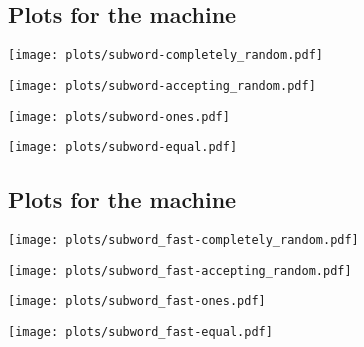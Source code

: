 \subsection{Plots for the  machine}
\label{plots_subword}
\begin{center}\texttt{[image: plots/subword-completely\_random.pdf]}\end{center}
\begin{center}\texttt{[image: plots/subword-accepting\_random.pdf]}\end{center}
\begin{center}\texttt{[image: plots/subword-ones.pdf]}\end{center}
\begin{center}\texttt{[image: plots/subword-equal.pdf]}\end{center}
\subsection{Plots for the  machine}
\label{plots_subword_fast}
\begin{center}\texttt{[image: plots/subword\_fast-completely\_random.pdf]}\end{center}
\begin{center}\texttt{[image: plots/subword\_fast-accepting\_random.pdf]}\end{center}
\begin{center}\texttt{[image: plots/subword\_fast-ones.pdf]}\end{center}
\begin{center}\texttt{[image: plots/subword\_fast-equal.pdf]}\end{center}
